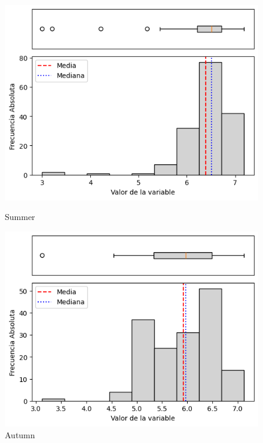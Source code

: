 \begin{figure}[H]
\centering
\begin{minipage}{0.30\textwidth}
  \includegraphics[width=\linewidth]{resultados/por_estacion_del_anio/boxplot_clases_por_estacion/Candavare/PET_HistBoxplot_Summer.png}
  \caption*{Summer}
\end{minipage}
\hfill
\begin{minipage}{0.30\textwidth}
  \includegraphics[width=\linewidth]{resultados/por_estacion_del_anio/boxplot_clases_por_estacion/Candavare/PET_HistBoxplot_Autumn.png}
  \caption*{Autumn}
\end{minipage}

\vspace{0.2cm}


\end{figure}
